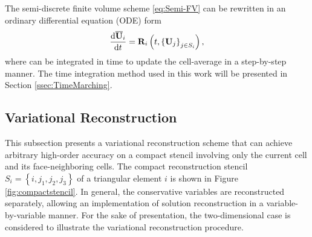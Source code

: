 
The semi-discrete finite volume scheme \eqref{eq:Semi-FV} can be rewritten in an ordinary differential equation (ODE) form
\begin{equation}
    \label{eq:FVODECell}
    \derivative{\uu_i}{t} = \R_i \left(t, \left\{\U_j\right\}_{j \in S_i} \right),
\end{equation}
where can be integrated in time to update the cell-average in a step-by-step manner. The time integration method used in this work will be presented in Section \ref{ssec:TimeMarching}.

\subsection{Variational Reconstruction}
\label{ssec:VR}

This subsection presents a variational reconstruction scheme \cite{wang2017compact_VR} that can achieve arbitrary high-order accuracy on a compact stencil involving only the current cell and its face-neighboring cells. The compact reconstruction stencil $S_i= \left\{i,j_1,j_2,j_3\right\}$ of a triangular element $i$ is shown in Figure \ref{fig:compactstencil}. In general, the conservative variables are reconstructed separately, allowing an implementation of solution reconstruction in a variable-by-variable manner. For the sake of presentation, the two-dimensional case is considered to illustrate the variational reconstruction procedure.

